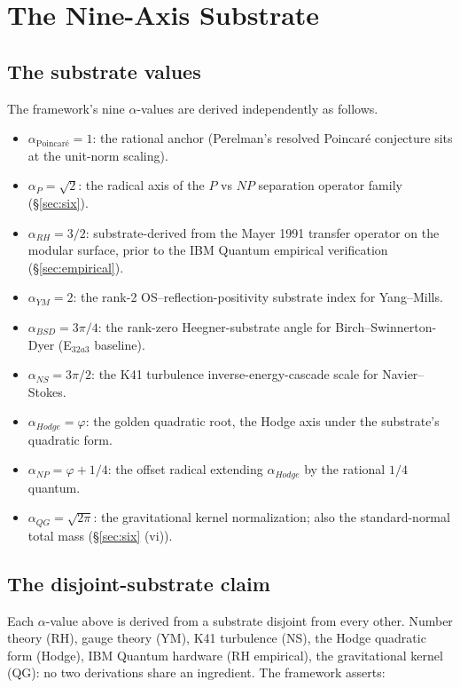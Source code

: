 \documentclass[11pt,a4paper]{amsart}
\theoremstyle{plain}
\theoremstyle{definition}
\newcommand{\aP}{\alpha_{P}}
\newcommand{\aNP}{\alpha_{NP}}
\newcommand{\aRH}{\alpha_{RH}}
\newcommand{\aYM}{\alpha_{YM}}
\newcommand{\aNS}{\alpha_{NS}}
\newcommand{\aBSD}{\alpha_{BSD}}
\newcommand{\aHodge}{\alpha_{Hodge}}
\newcommand{\aPoinc}{\alpha_{\text{Poincar\'e}}}
\newcommand{\aQG}{\alpha_{QG}}
\newcommand{\golden}{\varphi}
\begin{document}
\section{The Nine-Axis Substrate}
\label{sec:nine}

\subsection{The substrate values}
The framework's nine $\alpha$-values are derived independently as
follows.

\begin{itemize}[leftmargin=*]
\item $\aPoinc = 1$: the rational anchor (Perelman's resolved
Poincar\'e conjecture sits at the unit-norm scaling).

\item $\aP = \sqrt{2}$: the radical axis of the $P$ vs $NP$ separation
operator family (\S\ref{sec:six}).

\item $\aRH = 3/2$: substrate-derived from the Mayer 1991 transfer
operator on the modular surface, prior to the IBM Quantum
empirical verification (\S\ref{sec:empirical}).

\item $\aYM = 2$: the rank-2 OS--reflection-positivity substrate index
for Yang--Mills.

\item $\aBSD = 3\pi/4$: the rank-zero Heegner-substrate angle for
Birch--Swinnerton-Dyer (E$_{32a3}$ baseline).

\item $\aNS = 3\pi/2$: the K41 turbulence inverse-energy-cascade scale
for Navier--Stokes.

\item $\aHodge = \golden$: the golden quadratic root, the Hodge axis
under the substrate's quadratic form.

\item $\aNP = \golden + 1/4$: the offset radical extending $\aHodge$ by
the rational $1/4$ quantum.

\item $\aQG = \sqrt{2\pi}$: the gravitational kernel normalization;
also the standard-normal total mass (\S\ref{sec:six} (vi)).
\end{itemize}

\subsection{The disjoint-substrate claim}
\label{sec:disjoint}
Each $\alpha$-value above is derived from a substrate disjoint from
every other. Number theory (RH), gauge theory (YM), K41 turbulence
(NS), the Hodge quadratic form (Hodge), IBM Quantum hardware (RH
empirical), the gravitational kernel (QG): no two derivations share an
ingredient. The framework asserts:
\end{document}

